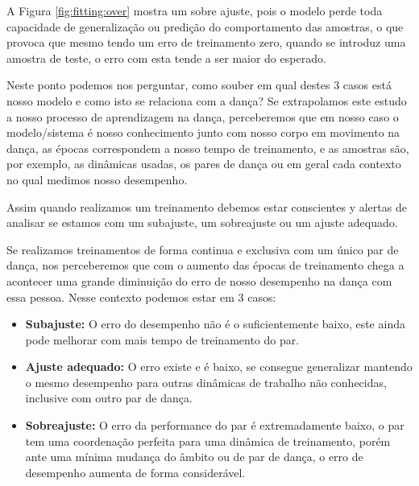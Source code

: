A Figura \ref{fig:fitting:over} mostra um sobre ajuste,
pois o modelo perde toda capacidade de generalização ou predição do comportamento das amostras, 
o que provoca que mesmo tendo um erro de treinamento zero,
quando se introduz uma amostra de teste, o erro com esta tende a ser maior do esperado. 

Neste ponto podemos nos perguntar, como souber em qual destes 3 casos está nosso modelo
e como isto se relaciona com a dança?
Se extrapolamos este estudo a nosso processo de aprendizagem na dança,
perceberemos que em nosso caso o modelo/sistema é nosso conhecimento junto com nosso corpo em movimento na dança,
as épocas correspondem a nosso tempo de treinamento, e as amostras
são, por exemplo, as dinâmicas usadas, os pares de dança ou em geral cada contexto no qual medimos nosso desempenho.  

Assim quando realizamos um treinamento debemos estar conscientes y alertas 
de analisar se estamos com um subajuste, um sobreajuste ou um ajuste adequado.
\begin{example}
\label{ex:fitting:1}
Se realizamos treinamentos de forma continua e exclusiva com um único par de dança,
nos perceberemos que
com o aumento das épocas de treinamento chega a acontecer uma grande diminuição do erro
de nosso desempenho na dança com essa pessoa. Nesse contexto podemos estar em 3 casos:
\begin{itemize}
\item \textbf{Subajuste:} O erro do desempenho não é o suficientemente baixo, este ainda pode 
melhorar com mais tempo de treinamento do par.
\item \textbf{Ajuste adequado:} O erro existe e é baixo, 
se consegue generalizar mantendo o mesmo desempenho para outras dinâmicas de trabalho não conhecidas, 
inclusive com outro par de dança. 
\item \textbf{Sobreajuste:} O erro da performance do par é extremadamente baixo, 
o par tem uma coordenação perfeita para uma dinâmica de treinamento, porém
 ante uma mínima mudança do âmbito ou de par de dança, 
 o erro de desempenho aumenta de forma considerável.
\end{itemize}
\end{example}

